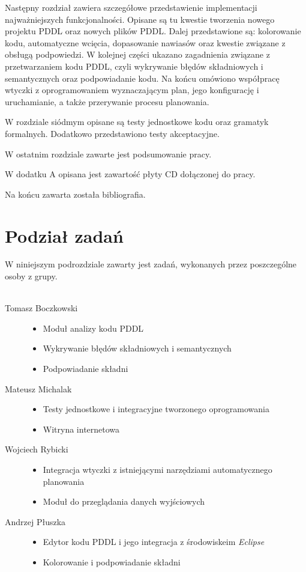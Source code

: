 Następny rozdział zawiera szczegółowe przedstawienie implementacji najważniejszych funkcjonalności. Opisane są tu kwestie tworzenia nowego projektu PDDL oraz nowych plików PDDL. Dalej przedstawione są: kolorowanie kodu, automatyczne wcięcia, dopasowanie nawiasów oraz kwestie związane z obsługą podpowiedzi. W kolejnej części ukazano zagadnienia związane z przetwarzaniem kodu PDDL, czyli wykrywanie błędów składniowych i semantycznych oraz podpowiadanie kodu. Na końcu omówiono współpracę wtyczki z oprogramowaniem wyznaczającym plan, jego konfigurację i uruchamianie, a także przerywanie procesu planowania.

W rozdziale siódmym opisane są testy jednostkowe kodu oraz gramatyk formalnych. Dodatkowo przedstawiono testy akceptacyjne.

W ostatnim rozdziale zawarte jest podsumowanie pracy.

W dodatku A opisana jest zawartość płyty CD dołączonej do pracy.

Na końcu zawarta została bibliografia.
\section{Podział zadań}
W niniejszym podrozdziale zawarty jest zadań, wykonanych przez poszczególne osoby z grupy.\\\\
\begin{description}
  \item[Tomasz Boczkowski] \hfill 
  \begin{itemize}
\item Moduł analizy kodu PDDL
\item Wykrywanie błędów składniowych i semantycznych
\item Podpowiadanie składni
\end{itemize}
  \item[Mateusz Michalak] \hfill 
    \begin{itemize}
\item Testy jednostkowe i integracyjne tworzonego oprogramowania
\item Witryna internetowa
\end{itemize}
  \item[Wojciech Rybicki] \hfill 
    \begin{itemize}
\item Integracja wtyczki z istniejącymi narzędziami automatycznego planowania
\item Moduł do przeglądania danych wyjściowych
\end{itemize}
  \item[Andrzej Płuszka] \hfill 
    \begin{itemize}
\item Edytor kodu PDDL i jego integracja z środowiskeim \textit{Eclipse}
\item Kolorowanie i podpowiadanie składni
\end{itemize}
\end{description}




